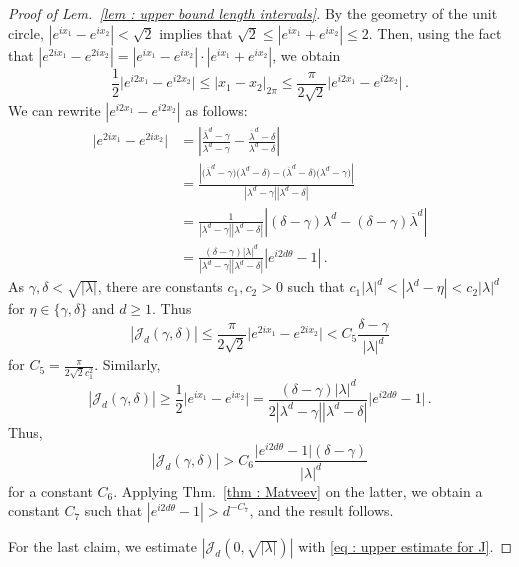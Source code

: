 \documentclass[a4paper,UKenglish,cleveref, autoref, thm-restate]{lipics-v2021}
\begin{document}
\begin{proof}[Proof of Lem.~\ref{lem : upper bound length intervals}]
    By the geometry of the unit circle, $|e^{ix_1} - e^{ix_2}| < \sqrt{2}$ implies that $\sqrt{2} \le |e^{ix_1} + e^{ix_2}| \le 2$. 
    Then, using the fact that $|e^{2ix_1}-e^{2ix_2}| = |e^{ix_1}-e^{ix_2}|\cdot|e^{ix_1}+e^{ix_2}|$, we obtain 
    \begin{equation*}
         \frac{1}{2}\big|e^{i2x_1} - e^{i2x_2}\big| \le |x_1-x_2|_{2\pi} 
        \le \frac{\pi}{2\sqrt{2}} \big|e^{i2x_1} - e^{i2x_2}\big| \, .
    \end{equation*}
    We can rewrite $|e^{i2x_1} - e^{i2x_2}|$ as follows:
    \begin{align*}
        \big|e^{2ix_1}-e^{2ix_2}\big| &= \left|\frac{\overline{\lambda}^d-\gamma}{\lambda^d-\gamma}-\frac{\overline{\lambda}^d-\delta}{\lambda^d-\delta}\right|\\
        &= \frac{\left|\big(\overline{\lambda}^d-\gamma\big)\big(\lambda^d-\delta)-\big(\overline{\lambda}^d-\delta\big)\big(\lambda^d-\gamma)\right|}{|\lambda^d-\gamma||\lambda^d-\delta|} \\
        &= \frac{1}{|\lambda^d-\gamma||\lambda^d-\delta|}\left|(\delta-\gamma)\lambda^d-(\delta-\gamma)\overline{\lambda}^d\right|\\
        &= \frac{(\delta-\gamma)|\lambda|^d}{|\lambda^d-\gamma||\lambda^d-\delta|}\left|e^{i2d\theta} - 1\right| \, .
    \end{align*}
    As $\gamma, \delta < \sqrt{|\lambda|}$, there are constants $c_1, c_2 > 0$ such that $c_1 |\lambda|^d < |\lambda^d - \eta| < c_2 |\lambda|^d$ for $\eta \in \{\gamma, \delta\}$ and $d \ge 1$.
    Thus
    \begin{equation}\label{eq : upper estimate for J}
        |\mathcal{J}_d(\gamma,\delta)| \le
        \frac{\pi}{2\sqrt{2}}\big|e^{2ix_1}-e^{2ix_2}\big| <
        C_5\frac{\delta-\gamma}{|\lambda|^d}
    \end{equation}
    for $C_5 = \frac{\pi}{2\sqrt{2}c_1^2}$.
    Similarly, 
    \begin{equation*}
    |\mathcal{J}_d(\gamma,\delta)| \ge \frac{1}{2}\big|e^{ix_1}-e^{ix_2}\big|  =
    \frac{(\delta-\gamma)|\lambda|^d}{2|\lambda^d-\gamma||\lambda^d-\delta|}\big|e^{i2d\theta} - 1\big|\,.
    \end{equation*}
    Thus,
    \begin{equation*}
    |\mathcal{J}_d(\gamma, \delta)| >  C_6 \frac{\big|e^{i2d\theta} - 1\big|(\delta-\gamma)}{|\lambda|^d}
    \end{equation*}
    for a constant $C_6$.
    Applying Thm.~\ref{thm : Matveev} on the latter, we obtain a constant $C_7$ such that $|e^{i2d\theta} - 1| > d^{-C_7}$, and the result follows.
    
    For the last claim, we estimate $|\mathcal{J}_d(0,\sqrt{|\lambda|})|$ with \eqref{eq : upper estimate for J}. 
\end{proof} 
\end{document}
